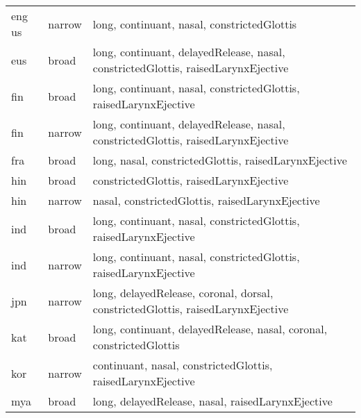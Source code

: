 {\begin{tabularx}{1.1\textwidth}{|llX|}
eng us             & narrow        & long, continuant, nasal, constrictedGlottis                                                                                        \\
eus                & broad         & long, continuant, delayedRelease, nasal, constrictedGlottis, raisedLarynxEjective                                                  \\
fin                & broad         & long, continuant, nasal, constrictedGlottis, raisedLarynxEjective                                                                  \\
fin                & narrow        & long, continuant, delayedRelease, nasal, constrictedGlottis, raisedLarynxEjective                                                  \\
fra                & broad         & long, nasal, constrictedGlottis, raisedLarynxEjective                                                                              \\
hin                & broad         & constrictedGlottis, raisedLarynxEjective                                                                                           \\
hin                & narrow        & nasal, constrictedGlottis, raisedLarynxEjective                                                                                    \\
ind                & broad         & long, continuant, nasal, constrictedGlottis, raisedLarynxEjective                                                                  \\
ind                & narrow        & long, continuant, nasal, constrictedGlottis, raisedLarynxEjective                                                                  \\
jpn                & narrow        & long, delayedRelease, coronal, dorsal, constrictedGlottis, raisedLarynxEjective                                                    \\
kat                & broad    & long, continuant, delayedRelease, nasal, coronal, constrictedGlottis                                                               \\
kor                & narrow        & continuant, nasal, constrictedGlottis, raisedLarynxEjective                                                                        \\
mya                & broad    & long, delayedRelease, nasal, raisedLarynxEjective                                                                                  \\

\end{tabularx}}
